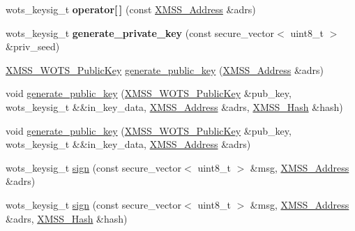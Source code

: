 \begin{DoxyCompactItemize}
\item 
\mbox{\label{class_botan_1_1_x_m_s_s___w_o_t_s___private_key_a8799a8fe53357143f60fbf33febe52bb}} 
wots\+\_\+keysig\+\_\+t {\bfseries operator\mbox{[}$\,$\mbox{]}} (const \hyperlink{class_botan_1_1_x_m_s_s___address}{X\+M\+S\+S\+\_\+\+Address} \&adrs)
\item 
\mbox{\label{class_botan_1_1_x_m_s_s___w_o_t_s___private_key_a120bf39f319ad35112dadf5ff718754c}} 
wots\+\_\+keysig\+\_\+t {\bfseries generate\+\_\+private\+\_\+key} (const secure\+\_\+vector$<$ uint8\+\_\+t $>$ \&priv\+\_\+seed)
\item 
\hyperlink{class_botan_1_1_x_m_s_s___w_o_t_s___public_key}{X\+M\+S\+S\+\_\+\+W\+O\+T\+S\+\_\+\+Public\+Key} \hyperlink{class_botan_1_1_x_m_s_s___w_o_t_s___private_key_a6557ddafc4e18ce4750c8a69b843481d}{generate\+\_\+public\+\_\+key} (\hyperlink{class_botan_1_1_x_m_s_s___address}{X\+M\+S\+S\+\_\+\+Address} \&adrs)
\item 
void \hyperlink{class_botan_1_1_x_m_s_s___w_o_t_s___private_key_a0d0695d108fd991536679070d88e4ea1}{generate\+\_\+public\+\_\+key} (\hyperlink{class_botan_1_1_x_m_s_s___w_o_t_s___public_key}{X\+M\+S\+S\+\_\+\+W\+O\+T\+S\+\_\+\+Public\+Key} \&pub\+\_\+key, wots\+\_\+keysig\+\_\+t \&\&in\+\_\+key\+\_\+data, \hyperlink{class_botan_1_1_x_m_s_s___address}{X\+M\+S\+S\+\_\+\+Address} \&adrs, \hyperlink{class_botan_1_1_x_m_s_s___hash}{X\+M\+S\+S\+\_\+\+Hash} \&hash)
\item 
void \hyperlink{class_botan_1_1_x_m_s_s___w_o_t_s___private_key_ac792421464c8da1e5587f1267b588d87}{generate\+\_\+public\+\_\+key} (\hyperlink{class_botan_1_1_x_m_s_s___w_o_t_s___public_key}{X\+M\+S\+S\+\_\+\+W\+O\+T\+S\+\_\+\+Public\+Key} \&pub\+\_\+key, wots\+\_\+keysig\+\_\+t \&\&in\+\_\+key\+\_\+data, \hyperlink{class_botan_1_1_x_m_s_s___address}{X\+M\+S\+S\+\_\+\+Address} \&adrs)
\item 
wots\+\_\+keysig\+\_\+t \hyperlink{class_botan_1_1_x_m_s_s___w_o_t_s___private_key_a8a392d55b4494010566455cf12c37e6c}{sign} (const secure\+\_\+vector$<$ uint8\+\_\+t $>$ \&msg, \hyperlink{class_botan_1_1_x_m_s_s___address}{X\+M\+S\+S\+\_\+\+Address} \&adrs)
\item 
wots\+\_\+keysig\+\_\+t \hyperlink{class_botan_1_1_x_m_s_s___w_o_t_s___private_key_a035d5d63b7042ebf1709e9c898956e96}{sign} (const secure\+\_\+vector$<$ uint8\+\_\+t $>$ \&msg, \hyperlink{class_botan_1_1_x_m_s_s___address}{X\+M\+S\+S\+\_\+\+Address} \&adrs, \hyperlink{class_botan_1_1_x_m_s_s___hash}{X\+M\+S\+S\+\_\+\+Hash} \&hash)

\end{DoxyCompactItemize}
